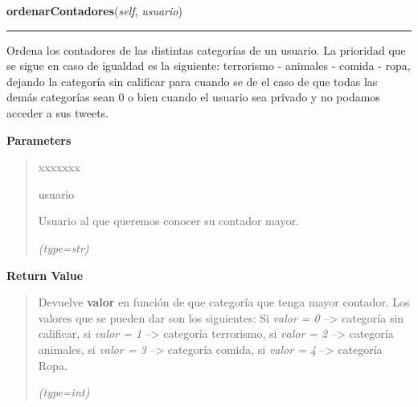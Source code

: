     \label{funcionesTwitter:FuncionesTwitter:ordenarContadores}

    \vspace{0.5ex}

\hspace{.8\funcindent}\begin{boxedminipage}{\funcwidth}

    \raggedright \textbf{ordenarContadores}(\textit{self}, \textit{usuario})

    \vspace{-1.5ex}

    \rule{\textwidth}{0.5\fboxrule}
\setlength{\parskip}{2ex}
    Ordena los contadores de las distintas categorías de un usuario. La 
    prioridad que se sigue en caso de igualdad es la siguiente: terrorismo 
    - animales - comida - ropa, dejando la categoría sin calificar para 
    cuando se de el caso de que todas las demás categorías sean 0 o bien 
    cuando el usuario sea privado y no podamos acceder a sus tweets.

\setlength{\parskip}{1ex}
      \textbf{Parameters}
      \vspace{-1ex}

      \begin{quote}
        \begin{Ventry}{xxxxxxx}

          \item[usuario]

          Usuario al que queremos conocer su contador mayor.

            {\it (type=str)}

        \end{Ventry}

      \end{quote}

      \textbf{Return Value}
    \vspace{-1ex}

      \begin{quote}
      Devuelve \textbf{valor} en función de que categoría que tenga mayor 
      contador. Los valores que se pueden dar son los siguientes: Si 
      \textit{valor = 0} --{\textgreater} categoría sin calificar, si 
      \textit{valor = 1} --{\textgreater} categoría terrorismo, si 
      \textit{valor = 2} --{\textgreater} categoría animales, si 
      \textit{valor = 3} --{\textgreater} categoría comida, si 
      \textit{valor = 4} --{\textgreater} categoría Ropa.

      {\it (type=int)}

      \end{quote}

    \end{boxedminipage}


